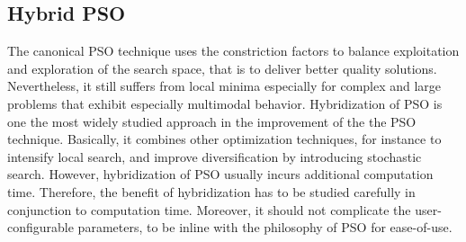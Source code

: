 


\subsection{Hybrid PSO}
The canonical PSO technique uses the constriction factors to balance exploitation and exploration of the search space, that is to deliver better quality solutions. Nevertheless, it still suffers from local minima especially for complex and large problems that exhibit especially multimodal behavior. Hybridization of PSO is one the most widely studied approach in the improvement of the the PSO technique. Basically, it combines other optimization techniques, for instance to intensify local search, and improve diversification by introducing stochastic search. However, hybridization of PSO usually incurs additional computation time. Therefore, the benefit of hybridization has to be studied carefully in conjunction to computation time. Moreover, it should not complicate the user-configurable parameters, to be inline with the philosophy of PSO for ease-of-use.


